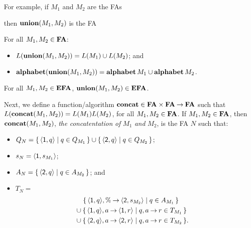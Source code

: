 For example, if $M_1$ and $M_2$ are the FAs
\begin{center}


\end{center}
then $\mathbf{union}(M_1,M_2)$ is the FA
\begin{center}

\end{center}

\begin{proposition}
For all $M_1,M_2\in\mathbf{FA}$:
\begin{itemize}
\item $L(\mathbf{union}(M_1,M_2))=L(M_1)\cup L(M_2)$; and

\item $\mathbf{alphabet}(\mathbf{union}(M_1,M_2))=\mathbf{alphabet}\,M_1\cup\mathbf{alphabet}\,M_2$.
\end{itemize}
\end{proposition}

\begin{proposition}
For all $M_1,M_2\in\mathbf{EFA}$, $\mathbf{union}(M_1,M_2)\in\mathbf{EFA}$.
\end{proposition}

Next, we define a function/algorithm $\mathbf{concat}\in\mathbf{FA}\times\mathbf{FA}\mathbin{\to}\mathbf{FA}$
such that $L(\mathbf{concat}(M_1,M_2))=L(M_1)L(M_2)$, for all
$M_1,M_2\in\mathbf{FA}$.  If $M_1,M_2\in\mathbf{FA}$, then $\mathbf{concat}(M_1,M_2)$, \emph{the
concatentation of} $M_1$ \emph{and} $M_2$, is the
FA $N$ such that:
\begin{itemize}
\item $Q_N=\{ \, \langle\mathsf{1},q\rangle \mid q\in Q_{M_1} \, \}\cup
\{ \, \langle\mathsf{2},q\rangle \mid q\in Q_{M_2} \, \}$;

\item $s_N=\langle\mathsf{1},s_{M_1}\rangle$;

\item $A_N=\{ \, \langle\mathsf{2},q\rangle \mid q\in
A_{M_2} \, \}$; and

\item $T_N={}$
  \begin{align*}
    &\quad\,
    \{ \, \langle\mathsf{1},q\rangle,\%\mathbin{\to}\langle\mathsf{2},s_{M_2}\rangle \mid q\in
      A_{M_1} \, \}
    \\
    &\cup
    \{ \, \langle\mathsf{1},q\rangle,a\mathbin{\to}\langle\mathsf{1},r\rangle \mid q,
      a\mathbin{\to} r\in T_{M_1} \, \}
    \\
    &\cup
    \{ \, \langle\mathsf{2},q\rangle,a\mathbin{\to}\langle\mathsf{2},r\rangle \mid q,
      a\mathbin{\to} r\in T_{M_2} \, \}.
  \end{align*}
\end{itemize}

